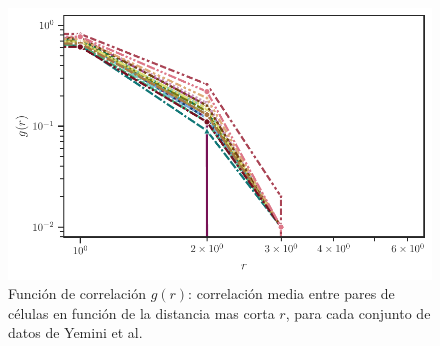    \begin{figure}[h!]
 	\centering\includegraphics[width=\imsize]{correlacion_experimento.pdf}
 	\caption[  Función de correlación $g(r)$: correlación media entre pares de células en función de la distancia mas corta  $r$, para cada conjunto de datos de Yemini et al.]{  Función de correlación $g(r)$: correlación media entre pares de células en función de la distancia mas corta  $r$, para cada conjunto de datos de Yemini et al.} \label{fig:correlacion_experimento}
 \end{figure}

 
 
